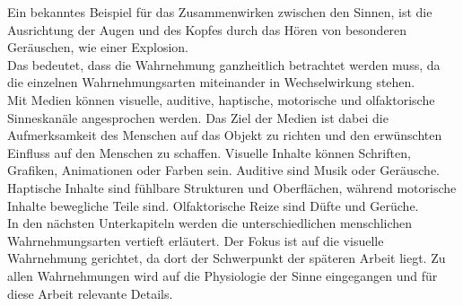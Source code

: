 Ein bekanntes Beispiel für das Zusammenwirken zwischen den Sinnen, ist die Ausrichtung der Augen und des Kopfes durch das Hören von besonderen Geräuschen, wie einer Explosion.\\
Das bedeutet, dass die Wahrnehmung ganzheitlich betrachtet werden muss, da die einzelnen Wahrnehmungsarten miteinander in Wechselwirkung stehen. \\
Mit Medien können visuelle, auditive, haptische, motorische und olfaktorische Sinneskanäle angesprochen werden. Das Ziel der Medien ist dabei die Aufmerksamkeit des Menschen auf das Objekt zu richten und den erwünschten Einfluss auf den Menschen zu schaffen. Visuelle Inhalte können Schriften, Grafiken, Animationen oder Farben sein. Auditive sind Musik oder Geräusche. Haptische Inhalte sind fühlbare Strukturen und Oberflächen, während motorische Inhalte bewegliche Teile sind. Olfaktorische Reize sind Düfte und Gerüche. \cite[Vgl. Seite 3]{Buhler.2017}\\
In den nächsten Unterkapiteln werden die unterschiedlichen menschlichen Wahrnehmungsarten vertieft erläutert. Der Fokus ist auf die visuelle Wahrnehmung gerichtet, da dort der Schwerpunkt der späteren Arbeit liegt. Zu allen Wahrnehmungen wird auf die Physiologie der Sinne eingegangen und für diese Arbeit relevante Details.
